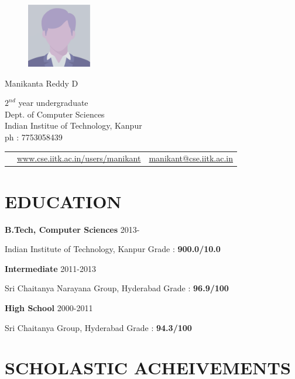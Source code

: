 \documentclass{article}
\newcommand{\sepspace}{\vspace*{0.8em}}
\newcommand{\MyName}[1]{
		\huge \usefont{OT1}{phv}{b}{n} \hfill #1 		
		\normalsize \normalfont
		}
\newcommand{\NewPart}[1]{\section*{\uppercase{#1}}}
\newcommand{\SkillsEntry}[3]{#1 & #2 & #3\\}
\newcommand{\EducationEntry}[4]{
		\noindent \textbf{#1} \hfill 	{#2} \par				
		\noindent #3 \hfill	
		Grade : \textbf{#4} 	
		}
\begin{document}
\begin{figure}
	\vspace*{-3em}
		\includegraphics[width=0.25\textwidth]{photo.eps}
\end{figure}

\MyName{Manikanta Reddy D}
\begin{flushright}
	$2^{nd}$ year undergraduate\\
	Dept. of Computer Sciences\\
	Indian Institue of Technology, Kanpur\\
	ph : 7753058439
	\begin{tabular}{m{}  m{} m{}}
	\SkillsEntry{}{\footnotesize{\url{www.cse.iitk.ac.in/users/manikant}}}{\href{mailto:manikant@cse.iitk.ac.in}{\footnotesize{\url{manikant@cse.iitk.ac.in}}}}
	\end{tabular}
\end{flushright}


\NewPart{Education}{}

\EducationEntry{B.Tech, Computer Sciences}{2013-}{Indian Institute of Technology, Kanpur}{900.0/10.0}

\sepspace

\EducationEntry{Intermediate}{2011-2013}{Sri Chaitanya Narayana Group, Hyderabad}{96.9/100}

\sepspace

\EducationEntry{High School}{2000-2011}{Sri Chaitanya Group, Hyderabad}{94.3/100}


\NewPart{Scholastic Acheivements}{}
\end{document}

